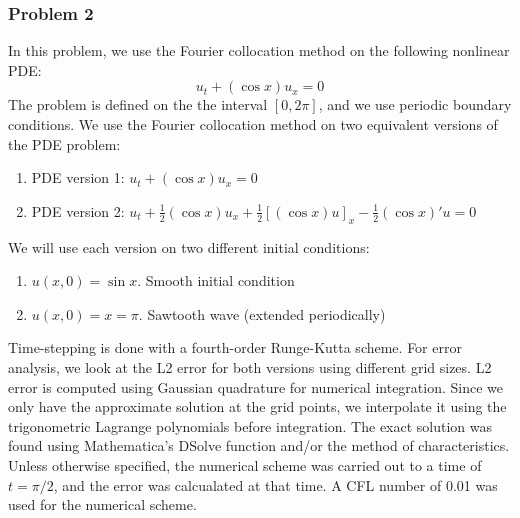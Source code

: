 \documentclass[12pt]{article}
\begin{document}
\subsubsection*{Problem 2}In this problem, we use the Fourier collocation method on the following nonlinear PDE:
\[
u_t + (\cos{x})u_x = 0
\]
The problem is defined on the the interval $[0, 2 \pi]$, and we use periodic boundary conditions. We use the Fourier collocation method on two equivalent versions of the PDE problem:
\begin{enumerate}
	\item PDE version 1: $u_t + (\cos{x})u_x = 0$
	\item PDE version 2: $u_t + \frac{1}{2} (\cos{x}) u_x + \frac{1}{2} [( \cos{x}) u]_x - \frac{1}{2} (\cos{x})' u = 0$
\end{enumerate}
We will use each version on two different initial conditions:
\begin{enumerate}
	\item $u(x, 0) = \sin{x}$. Smooth initial condition
	\item $u(x, 0) = x = \pi$. Sawtooth wave (extended periodically)
\end{enumerate}
Time-stepping is done with a fourth-order Runge-Kutta scheme. For error analysis, we look at the L2 error for both versions using different grid sizes. L2 error is computed using Gaussian quadrature for numerical integration. Since we only have the approximate solution at the grid points, we interpolate it using the trigonometric Lagrange polynomials before integration. The exact solution was found using Mathematica's DSolve function and/or the method of characteristics. Unless otherwise specified, the numerical scheme was carried out to a time of $t = \pi/2$, and the error was calcualated at that time. A CFL number of 0.01 was used for the numerical scheme.
\end{document}
